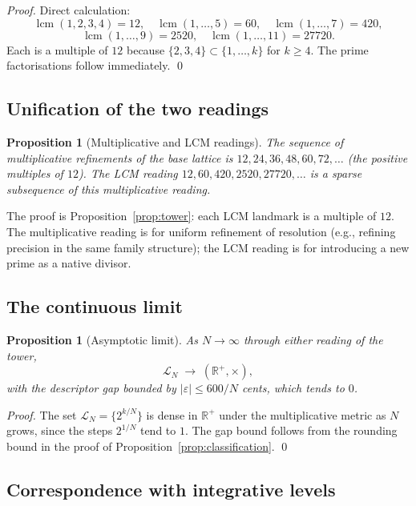 \documentclass[11pt,a4paper]{article}
\newtheorem{proposition}[theorem]{Proposition}
\theoremstyle{definition}
\theoremstyle{remark}
\newcommand{\R}{\mathbb{R}}
\DeclareMathOperator{\lcm}{lcm}
\newcommand{\eps}{\varepsilon}
\begin{document}
\begin{proof}
Direct calculation:
\[
\lcm(1,2,3,4)=12,\quad \lcm(1,\ldots,5)=60,\quad \lcm(1,\ldots,7)=420,
\]
\[
\lcm(1,\ldots,9)=2520,\quad \lcm(1,\ldots,11)=27720.
\]
Each is a multiple of $12$ because $\{2,3,4\}\subset\{1,\ldots,k\}$ for $k\ge 4$. The prime factorisations follow immediately. \qed
\end{proof}

\subsection{Unification of the two readings}

\begin{proposition}[Multiplicative and LCM readings]\label{prop:unification}
The sequence of multiplicative refinements of the base lattice is $12,24,36,48,60,72,\ldots$ (the positive multiples of $12$). The LCM reading $12,60,420,2520,27720,\ldots$ is a sparse subsequence of this multiplicative reading.
\end{proposition}

The proof is Proposition~\ref{prop:tower}: each LCM landmark is a multiple of $12$. The multiplicative reading is for uniform refinement of resolution (e.g., refining precision in the same family structure); the LCM reading is for introducing a new prime as a native divisor.

\subsection{The continuous limit}

\begin{proposition}[Asymptotic limit]\label{prop:limit}
As $N\to\infty$ through either reading of the tower,
\[
\mathcal{L}_{N} \;\longrightarrow\; (\R^{+},\times),
\]
with the descriptor gap bounded by $|\eps|\le 600/N$ cents, which tends to $0$.
\end{proposition}

\begin{proof}
The set $\mathcal{L}_{N}=\{2^{k/N}\}$ is dense in $\R^{+}$ under the multiplicative metric as $N$ grows, since the steps $2^{1/N}$ tend to $1$. The gap bound follows from the rounding bound in the proof of Proposition~\ref{prop:classification}. \qed
\end{proof}

\subsection{Correspondence with integrative levels}\label{subsec:levels-tower}
\end{document}
